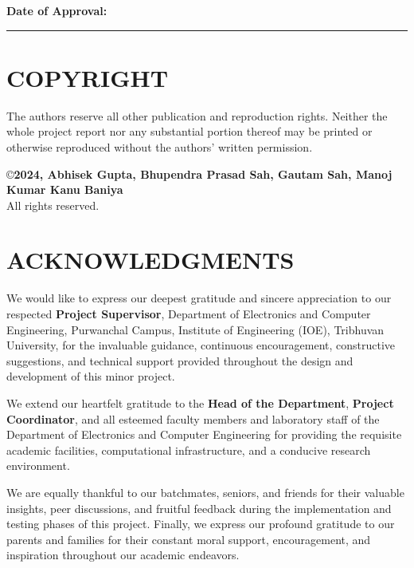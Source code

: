 \documentclass[12pt,a4paper]{report}
\begin{document}
\vspace{1.5cm}
\begin{center}
    \textbf{Date of Approval:} \rule{6cm}{0.4pt}
\end{center}

\newpage

\chapter*{COPYRIGHT}

\noindent The authors reserve all other publication and reproduction rights. Neither the whole project report nor any substantial portion thereof may be printed or otherwise reproduced without the authors' written permission.

\vspace{1.5cm}

\noindent \copyright \textbf{2024, Abhisek Gupta, Bhupendra Prasad Sah, Gautam Sah, Manoj Kumar Kanu Baniya} \\
All rights reserved.

\newpage

\chapter*{ACKNOWLEDGMENTS}

We would like to express our deepest gratitude and sincere appreciation to our respected \textbf{Project Supervisor}, Department of Electronics and Computer Engineering, Purwanchal Campus, Institute of Engineering (IOE), Tribhuvan University, for the invaluable guidance, continuous encouragement, constructive suggestions, and technical support provided throughout the design and development of this minor project.

We extend our heartfelt gratitude to the \textbf{Head of the Department}, \textbf{Project Coordinator}, and all esteemed faculty members and laboratory staff of the Department of Electronics and Computer Engineering for providing the requisite academic facilities, computational infrastructure, and a conducive research environment.

We are equally thankful to our batchmates, seniors, and friends for their valuable insights, peer discussions, and fruitful feedback during the implementation and testing phases of this project. Finally, we express our profound gratitude to our parents and families for their constant moral support, encouragement, and inspiration throughout our academic endeavors.
\end{document}
